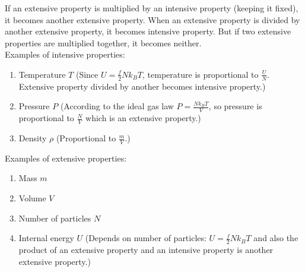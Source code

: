 \documentclass[12pt, a4paper]{article}
\begin{document}
If an extensive property is multiplied by an intensive property (keeping it fixed), it becomes another extensive property. When an extensive property is divided by another extensive property, it becomes intensive property. But if two extensive properties are multiplied together, it becomes neither. \\

Examples of intensive properties:

\begin{enumerate}
\item Temperature $T$ (Since $U=\frac{f}{2}Nk_BT$, temperature is proportional to $\frac{U}{N}$. Extensive property divided by another becomes intensive property.)
\item Pressure $P$ (According to the ideal gas law $P=\frac{Nk_BT}{V}$, so pressure is proportional to $\frac{N}{V}$ which is an extensive property.)
\item Density $\rho$ (Proportional to $\frac{m}{V}$.)
\end{enumerate}

Examples of extensive properties:

\begin{enumerate}
\item Mass $m$
\item Volume $V$
\item Number of particles $N$
\item Internal energy $U$ (Depends on number of particles: $U=\frac{f}{2}Nk_BT$ and also the product of an extensive property and an intensive property is another extensive property.)
\end{enumerate}
\end{document}

